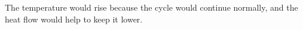 The temperature would rise because the cycle would continue normally, and the heat flow would help to keep it lower.